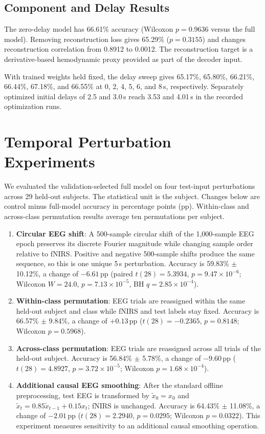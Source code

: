 \documentclass[journal]{IEEEtran}
\begin{document}
\subsection{Component and Delay Results}
The zero-delay model has 66.61\% accuracy (Wilcoxon $p=0.9636$ versus the full model). Removing reconstruction loss gives 65.29\% ($p=0.3155$) and changes reconstruction correlation from 0.8912 to 0.0012. The reconstruction target is a derivative-based hemodynamic proxy provided as part of the decoder input.

With trained weights held fixed, the delay sweep gives 65.17\%, 65.80\%, 66.21\%, 66.44\%, 67.18\%, and 66.55\% at 0, 2, 4, 5, 6, and 8\,s, respectively. Separately optimized initial delays of 2.5 and 3.0\,s reach 3.53 and 4.01\,s in the recorded optimization runs.

\section{Temporal Perturbation Experiments}
We evaluated the validation-selected full model on four test-input perturbations across 29 held-out subjects. The statistical unit is the subject. Changes below are control minus full-model accuracy in percentage points (pp). Within-class and across-class permutation results average ten permutations per subject.
\begin{enumerate}
\item \textbf{Circular EEG shift}: A 500-sample circular shift of the 1,000-sample EEG epoch preserves its discrete Fourier magnitude while changing sample order relative to fNIRS. Positive and negative 500-sample shifts produce the same sequence, so this is one unique 5\,s perturbation. Accuracy is 59.83\% $\pm$ 10.12\%, a change of $-6.61$\,pp (paired $t(28)=5.3934$, $p=9.47 \times 10^{-6}$; Wilcoxon $W=24.0$, $p=7.13 \times 10^{-5}$, BH $q=2.85 \times 10^{-4}$).
\item \textbf{Within-class permutation}: EEG trials are reassigned within the same held-out subject and class while fNIRS and test labels stay fixed. Accuracy is 66.57\% $\pm$ 9.84\%, a change of $+0.13$\,pp ($t(28)=-0.2365$, $p=0.8148$; Wilcoxon $p=0.5968$).
\item \textbf{Across-class permutation}: EEG trials are reassigned across all trials of the held-out subject. Accuracy is 56.84\% $\pm$ 5.78\%, a change of $-9.60$\,pp ($t(28)=4.8927$, $p=3.72 \times 10^{-5}$; Wilcoxon $p=1.68 \times 10^{-4}$).
\item \textbf{Additional causal EEG smoothing}: After the standard offline preprocessing, test EEG is transformed by $\widetilde{x}_0=x_0$ and $\widetilde{x}_t=0.85\widetilde{x}_{t-1}+0.15x_t$; fNIRS is unchanged. Accuracy is 64.43\% $\pm$ 11.08\%, a change of $-2.01$\,pp ($t(28)=2.2940$, $p=0.0295$; Wilcoxon $p=0.0322$). This experiment measures sensitivity to an additional causal smoothing operation.
\end{enumerate}
\end{document}

